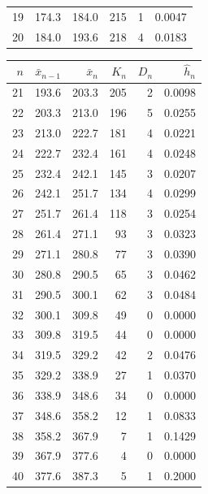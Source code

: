 \documentclass[11pt]{article}
\begin{document}
\begin{table}[H]
\begin{minipage}[t]{0.48\textwidth}
\begin{tabular}{rrrrrr}
      19 & 174.3 & 184.0 & 215 & 1 & 0.0047 \\
      20 & 184.0 & 193.6 & 218 & 4 & 0.0183 \\
      \bottomrule
    \end{tabular}
  \end{minipage}\hfill
  \begin{minipage}[t]{0.48\textwidth}
    \centering
    \begin{tabular}{rrrrrr}
      \toprule
      $n$ & $\bar x_{n-1}$ & $\bar x_n$ & $K_n$ & $D_n$ & $\hat h_n$ \\
      \midrule
      21 & 193.6 & 203.3 & 205 & 2 & 0.0098 \\
      22 & 203.3 & 213.0 & 196 & 5 & 0.0255 \\
      23 & 213.0 & 222.7 & 181 & 4 & 0.0221 \\
      24 & 222.7 & 232.4 & 161 & 4 & 0.0248 \\
      25 & 232.4 & 242.1 & 145 & 3 & 0.0207 \\
      26 & 242.1 & 251.7 & 134 & 4 & 0.0299 \\
      27 & 251.7 & 261.4 & 118 & 3 & 0.0254 \\
      28 & 261.4 & 271.1 & 93 & 3 & 0.0323 \\
      29 & 271.1 & 280.8 & 77 & 3 & 0.0390 \\
      30 & 280.8 & 290.5 & 65 & 3 & 0.0462 \\
      31 & 290.5 & 300.1 & 62 & 3 & 0.0484 \\
      32 & 300.1 & 309.8 & 49 & 0 & 0.0000 \\
      33 & 309.8 & 319.5 & 44 & 0 & 0.0000 \\
      34 & 319.5 & 329.2 & 42 & 2 & 0.0476 \\
      35 & 329.2 & 338.9 & 27 & 1 & 0.0370 \\
      36 & 338.9 & 348.6 & 34 & 0 & 0.0000 \\
      37 & 348.6 & 358.2 & 12 & 1 & 0.0833 \\
      38 & 358.2 & 367.9 & 7 & 1 & 0.1429 \\
      39 & 367.9 & 377.6 & 4 & 0 & 0.0000 \\
      40 & 377.6 & 387.3 & 5 & 1 & 0.2000 \\
      \bottomrule
    \end{tabular}
  \end{minipage}
\end{table}

\end{document}

